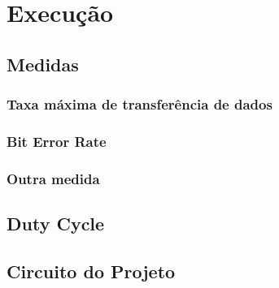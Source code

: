 	\chapter{Execução}\label{cap-execucao}
	
	\section{Medidas}
	
	\subsection{Taxa máxima de transferência de dados}
	
	\subsection{Bit Error Rate}
	
	\subsection{Outra medida}
	
	\section{Duty Cycle}
	
	\section{Circuito do Projeto}
